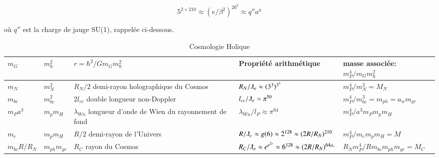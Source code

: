 \documentclass[a4paper,9pt]{article}
\newcounter{col}
\begin{document}
 \begin{equation}
5^{2\times210} \approx (e/\beta^2)^{26^2} \approx q'' a^a
 \end{equation}
 
 où $q''$ est la charge de jauge SU(1), rappelée ci-dessous.


 
 
 
 
\begin{table}
\caption[Table \ref{tab:5:table5}: Cosmologie Holique.]{Cosmologie Holique}
\label{tab:5:table5}
  \hskip-2.0cm\begin{tabular}{lllll}
    \toprule
    \cmidrule(r){1-4}
    $m_G$ & $m_{\hbar}^2$    & $r = \hbar^2/Gm_G m_{\hbar}^2$  & Propriété arithmétique & masse associée: $m_P^4/m_G m_{\hbar}^2$ \\
    \midrule
    
    
    $m_N $ & $m_N^2$   & $R_N/2$ demi-rayon holographique du Cosmos & $R_N/\lambdabar_e \approx (3^3)^{3^3}$&  $m_P^4/m_N^3 = M_N$ \\
    $m_{bc} $ & $m_{bc}^2$   & $2l_{cc}$ double longueur non-Doppler & $ l_{cc}/\lambdabar_e \approx \pi^{50}$&  $m_P^4/m_{bc}^3 = m_{ph} = a_w m_{gr}$  \\
    $m_Pa^3 $ & $m_pm_H$   & $\lambda_{Wn}$ longueur d'onde de Wien du rayonnement de fond & $\lambda_{Wn}/l_P \approx \pi^{64}$& $m_P^4/a^3m_Pm_pm_H$ \\
    $m_e $ & $m_pm_H$   & $R/2$ demi-rayon de l'Univers & $R/\lambdabar_e \approx g(6) \approx 2^{128}\approx (2R/R_N)^{210}$   & $m_P^4/m_em_pm_H = M$ \\
    
    $m_{bc}R/R_N $ & $m_{ph}m_{gr}$   & $R_C$ rayon du Cosmos & $ R_C/\lambdabar_e \approx e^{e^{2e}} \approx 6^{128}\approx (2R/R_N)^{64a_s}  $&  $R_Nm_P^4/Rm_{bc}m_{ph}m_{gr} = M_C $ \\
    
  
         
   \bottomrule
  \end{tabular}
\end{table}
\end{document}
